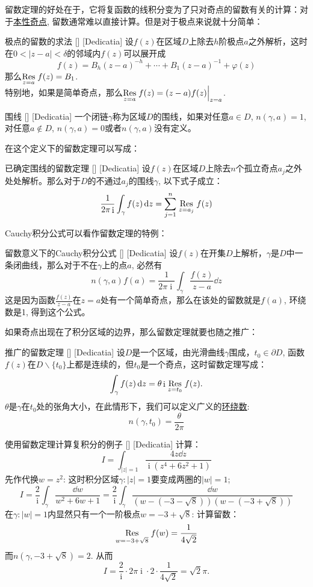 \documentclass[UTF8]{ctexart}
\DeclareMathOperator{\ii}{\mathrm{i}}
\newcommand{\EssentialSingularity}{\hyperref[dfn:EssentialSingularity]{本性奇点}}
\begin{document}
留数定理的好处在于，它将复函数的线积分变为了只对奇点的留数有关的计算：对于\EssentialSingularity , 留数通常难以直接计算。但是对于极点来说就十分简单：
\begin{crl}
    [UUID]
    {极点的留数的求法}
    []
    [Dedicatia]
    设$f(z)$在区域$D$上除去$h$阶极点$a$之外解析，这时在$0<|z-a|<\delta$的邻域内$f(z)$可以展开成
    \[f(z)=B_h(z-a)^{-h}+\cdots+B_1(z-a)^{-1}+\varphi(z)\]
    那么$\underset{z=a}{\Res}f(z)=B_1$.\\
    特别地，如果是简单奇点，那么$\underset{z=a}{\Res}f(z)=(z-a)f(z)\Big|_{z=a}$.
\end{crl}
\begin{dfn}
    [UUID]
    {围线}
    []
    [Dedicatia]
    一个闭链$\gamma$称为区域$D$的围线，如果对任意$a\in D$, $n(\gamma,a)=1$, 对任意$a\notin D$, $n(\gamma,a)=0$或者$n(\gamma,a)$没有定义。
\end{dfn}
在这个定义下的留数定理可以写成：
\begin{crl}
    [UUID]
    {已确定围线的留数定理}
    []
    [Dedicatia]
    设$f(z)$在区域$D$上除去$n$个孤立奇点$a_j$之外处处解析。那么对于$D$的不通过$a_j$的围线$\gamma$, 以下式子成立：
    \[\frac{1}{2\pi\ii}\int_\gamma f(z)\dd{z}=\sum_{j=1}^{n}\underset{z=a_j}{\Res}f(z)\]
\end{crl}
Cauchy积分公式可以看作留数定理的特例：
\begin{crl}
    [UUID]
    {留数意义下的Cauchy积分公式}
    []
    [Dedicatia]
    设$f(z)$在开集$D$上解析，$\gamma$是$D$中一条闭曲线，那么对于不在$\gamma$上的点$a$, 必然有
    \[n(\gamma,a)f(a)=\frac{1}{2\pi\ii}\int_\gamma\frac{f(z)}{z-a}\dd{z} \]
    这是因为函数$\frac{f(z)}{z-a}$在$z=a$处有一个简单奇点，那么在该处的留数就是$f(a)$, 环绕数是1, 得到这个公式。
\end{crl}
如果奇点出现在了积分区域的边界，那么留数定理就要也随之推广：
\begin{thm}
    [UUID]
    {推广的留数定理}
    []
    [Dedicatia]
    设$D$是一个区域，由光滑曲线$\gamma$围成，$t_0\in\partial D$, 函数$f(z)$在$D\backslash\{t_0\}$上都是连续的，但$t_0$是一个奇点，这时留数定理写成：
    \[\int_\gamma f(z)\dd{z}=\theta\ii \underset{z=t_0}{\Res}f(z).\]
    $\theta$是$\gamma$在$t_0$处的张角大小，在此情形下，我们可以定义广义的\hyperref[dfn:WindingNumber]{环绕数}:
    \[n(\gamma,t_0)=\frac{\theta}{2\pi}\]
\end{thm}
\begin{xmp}
    [UUID]
    {使用留数定理计算复积分的例子}
    []
    [Dedicatia]
    计算：
    \[I=\int_{|z|=1}\frac{4z\dd{z}}{\ii(z^4+6z^2+1)}\]
    先作代换$w=z^2$: 这时积分区域$\gamma:|z|=1$要变成两圈的$|w|=1$;
    \[I=\frac{2}{\ii}\int_{\gamma}\frac{\dd{w}}{w^2+6w+1}=\frac{2}{\ii}\int_{\gamma}\frac{\dd{w}}{(w-(-3-\sqrt{8}))(w-(-3+\sqrt{8}))}\]
    在$\gamma:|w|=1$内显然只有一个一阶极点$w=-3+\sqrt{8}$: 计算留数：
    \[\underset{w=-3+\sqrt{8}}{\Res}f(w)=\frac{1}{4\sqrt{2}}\]
    而$n(\gamma,-3+\sqrt{8})=2$. 从而
    \[I=\frac{2}{\ii}\cdot 2\pi\ii\cdot 2\cdot\frac{1}{4\sqrt{2}}=\sqrt{2}\pi.\]
\end{xmp}
\end{document}
